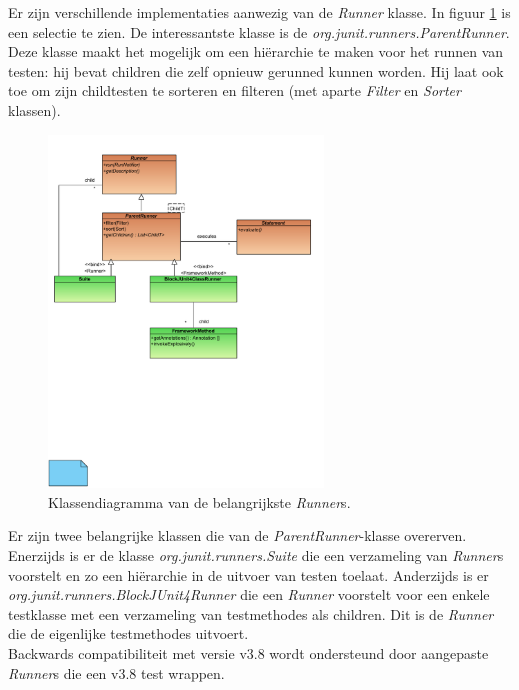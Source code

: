 \documentclass[i1]{oss}
\begin{document}
Er zijn verschillende implementaties aanwezig van de \emph{Runner} klasse. In figuur \ref{fig:diagrams:Runner} is een selectie te zien. De interessantste klasse is de \emph{org.junit.runners.ParentRunner}. Deze klasse maakt het mogelijk om een hi\"erarchie te maken voor het runnen van testen: hij bevat children die zelf opnieuw gerunned kunnen worden. Hij laat ook toe om zijn childtesten te sorteren en filteren (met aparte \emph{Filter} en \emph{Sorter} klassen).\\

\begin{figure}[hb!]
	\centering
	\includegraphics[width=0.65\textwidth]{ClassDiagramRunner}
	\caption{Klassendiagramma van de belangrijkste \emph{Runner}s.}
	\label{fig:diagrams:Runner}
\end{figure}

Er zijn twee belangrijke klassen die van de \emph{ParentRunner}-klasse overerven. Enerzijds is er de klasse \emph{org.junit.runners.Suite} die een verzameling van \emph{Runner}s voorstelt en zo een hi\"erarchie in de uitvoer van testen toelaat. Anderzijds is er \emph{org.junit.runners.BlockJUnit4Runner} die een \emph{Runner} voorstelt voor een enkele testklasse met een verzameling van testmethodes als children. Dit is de \emph{Runner} die de eigenlijke testmethodes uitvoert.\\

Backwards compatibiliteit met versie v3.8 wordt ondersteund door aangepaste \emph{Runner}s die een v3.8 test wrappen.
\end{document}
